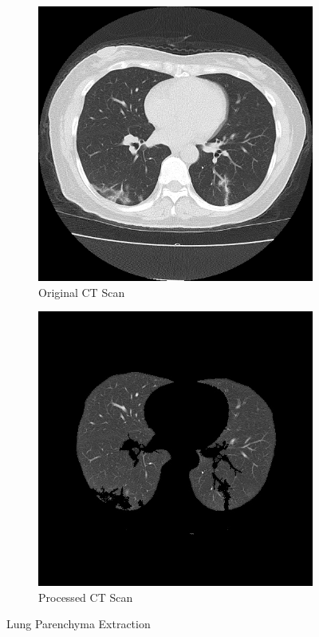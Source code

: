 \begin{figure}[H]
        \begin{subfigure}[b]{0.5\textwidth}
                \includegraphics[width=\linewidth]{Images/NonProcessed pCT1.jpg}
                \caption{Original CT Scan}
                \label{fig:unbalanced}
        \end{subfigure}%
        \begin{subfigure}[b]{0.5\textwidth}
                \includegraphics[width=\linewidth]{Images/Processed pCT1.jpg}
                \caption{Processed CT Scan}
                \label{fig:balanced}
        \end{subfigure}%
        \caption{Lung Parenchyma Extraction}\label{fig:extract}
\end{figure}

